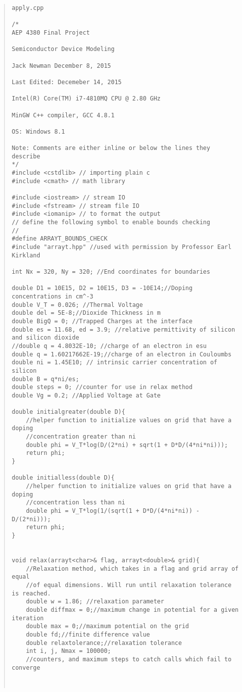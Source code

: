 \documentclass[11pt,letterpaper]{article}
\begin{document}
\begin{quote} \footnotesize
\begin{lstlisting}
apply.cpp

/*
AEP 4380 Final Project

Semiconductor Device Modeling

Jack Newman December 8, 2015

Last Edited: Decemeber 14, 2015

Intel(R) Core(TM) i7-4810MQ CPU @ 2.80 GHz

MinGW C++ compiler, GCC 4.8.1

OS: Windows 8.1

Note: Comments are either inline or below the lines they describe
*/
#include <cstdlib> // importing plain c
#include <cmath> // math library

#include <iostream> // stream IO
#include <fstream> // stream file IO
#include <iomanip> // to format the output
// define the following symbol to enable bounds checking
//
#define ARRAYT_BOUNDS_CHECK
#include "arrayt.hpp" //used with permission by Professor Earl Kirkland

int Nx = 320, Ny = 320; //End coordinates for boundaries

double D1 = 10E15, D2 = 10E15, D3 = -10E14;//Doping concentrations in cm^-3
double V_T = 0.026; //Thermal Voltage
double del = 5E-8;//Dioxide Thickness in m
double BigQ = 0; //Trapped Charges at the interface
double es = 11.68, ed = 3.9; //relative permittivity of silicon and silicon dioxide
//double q = 4.8032E-10; //charge of an electron in esu
double q = 1.60217662E-19;//charge of an electron in Couloumbs
double ni = 1.45E10; // intrinsic carrier concentration of silicon
double B = q*ni/es; 
double steps = 0; //counter for use in relax method
double Vg = 0.2; //Applied Voltage at Gate

double initialgreater(double D){
	//helper function to initialize values on grid that have a doping
	//concentration greater than ni
	double phi = V_T*log(D/(2*ni) + sqrt(1 + D*D/(4*ni*ni)));
	return phi;
}

double initialless(double D){
	//helper function to initialize values on grid that have a doping
	//concentration less than ni
	double phi = V_T*log(1/(sqrt(1 + D*D/(4*ni*ni)) - D/(2*ni)));
	return phi;
}


void relax(arrayt<char>& flag, arrayt<double>& grid){
	//Relaxation method, which takes in a flag and grid array of equal
	//of equal dimensions. Will run until relaxation tolerance is reached.
	double w = 1.86; //relaxation parameter
	double diffmax = 0;//maximum change in potential for a given iteration
	double max = 0;//maximum potential on the grid
	double fd;//finite difference value
	double relaxtolerance;//relaxation tolerance
	int i, j, Nmax = 100000;
	//counters, and maximum steps to catch calls which fail to converge



\end{lstlisting}
\end{quote}
\end{document}
